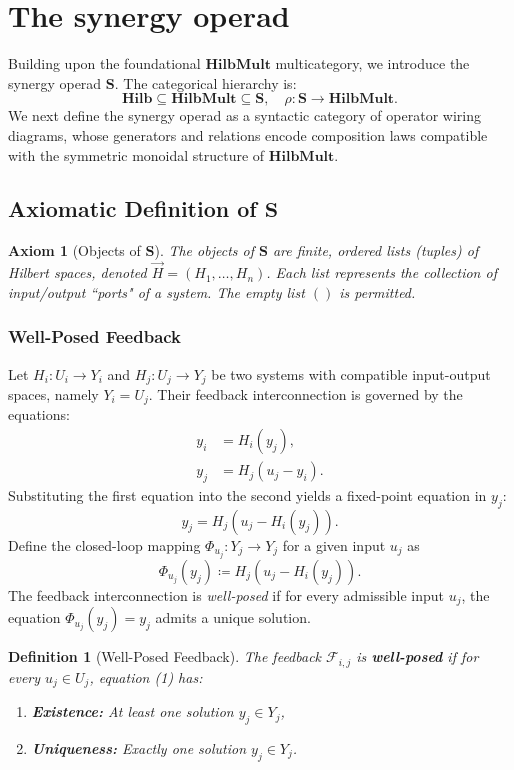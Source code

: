 \documentclass[11pt]{article}
\newtheorem{definition}{Definition}
\newtheorem{axiom}{Axiom}
\begin{document}
\section{The synergy operad}\label{sec:The synergy operad}


Building upon the foundational $\mathbf{HilbMult}$ multicategory, we introduce the synergy operad $\mathbf{S}$. The categorical hierarchy is:
\[
\mathbf{Hilb} \subseteq \mathbf{HilbMult} \subseteq \mathbf{S}, \quad \rho: \mathbf{S} \to \mathbf{HilbMult}.
\]
We next define the synergy operad as a syntactic category of operator wiring diagrams, whose generators and relations encode composition laws compatible with the symmetric monoidal structure of $\mathbf{HilbMult}$.

\subsection*{Axiomatic Definition of $\mathbf{S}$}

\begin{axiom}[Objects of $\mathbf{S}$]\label{ax:S1}
The objects of $\mathbf{S}$ are finite, ordered lists (tuples) of Hilbert spaces, denoted $\vec{H} = (H_1, \dots, H_n)$. Each list represents the collection of input/output ``ports" of a system. The empty list $()$ is permitted.
\end{axiom}

\subsubsection*{Well-Posed Feedback}

Let $H_i: U_i \to Y_i$ and $H_j: U_j \to Y_j$ be two systems with compatible input-output spaces, namely $Y_i = U_j$. Their feedback interconnection is governed by the equations:
\[
\begin{aligned}
y_i &= H_i(y_j), \\
y_j &= H_j(u_j - y_i).
\end{aligned}
\]
Substituting the first equation into the second yields a fixed-point equation in $y_j$:
\[
y_j = H_j(u_j - H_i(y_j)). \tag{1}
\]
Define the closed-loop mapping $\Phi_{u_j}: Y_j \to Y_j$ for a given input $u_j$ as
\[
\Phi_{u_j}(y_j) \coloneqq H_j(u_j - H_i(y_j)).
\]
The feedback interconnection is \emph{well-posed} if for every admissible input $u_j$, the equation $\Phi_{u_j}(y_j) = y_j$ admits a unique solution.

\begin{definition}[Well-Posed Feedback]\label{def:Well-Posed Feedback}
The feedback $\mathcal{F}_{i,j}$ is \textbf{well-posed} if for every $u_j \in U_j$, equation (1) has:
\begin{enumerate}
    \item \textbf{Existence:} At least one solution $y_j \in Y_j$,
    \item \textbf{Uniqueness:} Exactly one solution $y_j \in Y_j$.
\end{enumerate}
\end{definition}
\end{document}
